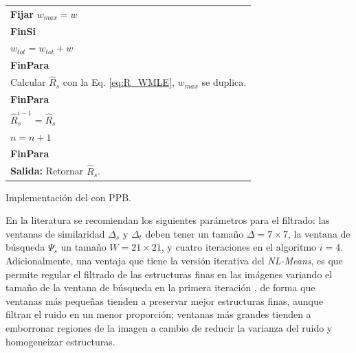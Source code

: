 \begin{algorithm}
\begin{tabularx}{0.8\textwidth}{l}
		\hspace*{1.5cm} \textbf{Fijar} $w_{max} = w$\\
		\hspace*{1.3cm} \textbf{FinSi}\\
		\hspace*{1.3cm} $w_{tot} = w_{tot} + w$\\
		\hspace*{1.1cm} \textbf{FinPara}\\
		\hspace*{1.1cm} Calcular $\hat{R}_s$ con la Eq. \ref{eq:R_WMLE}, $w_{max}$ se duplica.\\
		\hspace*{0.9cm}\textbf{FinPara}\\
		\hspace*{0.9cm} $\hat{R}^{i-1}_s = \hat{R}_s$\\
		\hspace*{0.9cm} $n = n + 1$\\
		\hspace*{0.6cm}\textbf{FinPara}\\
		\hspace*{0.6cm}\textbf{Salida:} Retornar $\hat{R}_s$.\\
		
	\end{tabularx}
	\caption{Implementación del \nlmeans con PPB.}
	\label{alg:nlmeansppb}
\end{algorithm}


En la literatura \cite{Deledalle2009,Baudes2005} se recomiendan los siguientes parámetros para el filtrado: las ventanas de similaridad $\Delta_s$ y $\Delta_t$ deben tener un tamaño $\Delta = 7 \times 7$, la ventana de búsqueda $\Psi_s$ un tamaño $W = 21\times 21$, y cuatro iteraciones en el algoritmo $i = 4$. Adicionalmente, una ventaja que tiene la versión iterativa del \textit{NL-Means}, es que permite regular el filtrado de las estructuras finas en las imágenes variando el tamaño de la ventana de búsqueda en la primera iteración \cite{Deledalle2009}, de forma que ventanas más pequeñas tienden a preservar mejor estructuras finas, aunque filtran el ruido en un menor proporción; ventanas más grandes tienden a emborronar regiones de la imagen a cambio de reducir la varianza del ruido y homogeneizar estructuras. %

